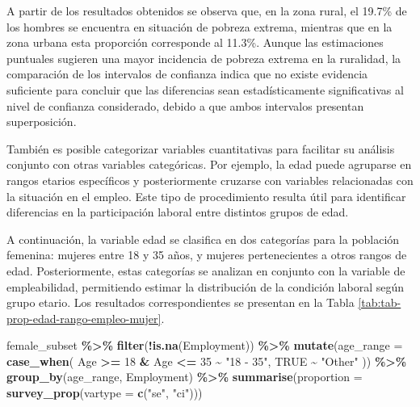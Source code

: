 \documentclass[
  spanish,
  12pt,
]{book}
\newenvironment{Shaded}{\begin{snugshade}}{\end{snugshade}}
\newcommand{\AttributeTok}[1]{\textcolor[rgb]{0.13,0.29,0.53}{#1}}
\newcommand{\ConstantTok}[1]{\textcolor[rgb]{0.56,0.35,0.01}{#1}}
\newcommand{\DecValTok}[1]{\textcolor[rgb]{0.00,0.00,0.81}{#1}}
\newcommand{\FunctionTok}[1]{\textcolor[rgb]{0.13,0.29,0.53}{\textbf{#1}}}
\newcommand{\NormalTok}[1]{#1}
\newcommand{\SpecialCharTok}[1]{\textcolor[rgb]{0.81,0.36,0.00}{\textbf{#1}}}
\newcommand{\StringTok}[1]{\textcolor[rgb]{0.31,0.60,0.02}{#1}}
\begin{document}
A partir de los resultados obtenidos se observa que, en la zona rural, el 19.7\% de los hombres se encuentra en situación de pobreza extrema, mientras que en la zona urbana esta proporción corresponde al 11.3\%. Aunque las estimaciones puntuales sugieren una mayor incidencia de pobreza extrema en la ruralidad, la comparación de los intervalos de confianza indica que no existe evidencia suficiente para concluir que las diferencias sean estadísticamente significativas al nivel de confianza considerado, debido a que ambos intervalos presentan superposición.

También es posible categorizar variables cuantitativas para facilitar su análisis conjunto con otras variables categóricas. Por ejemplo, la edad puede agruparse en rangos etarios específicos y posteriormente cruzarse con variables relacionadas con la situación en el empleo. Este tipo de procedimiento resulta útil para identificar diferencias en la participación laboral entre distintos grupos de edad.

A continuación, la variable edad se clasifica en dos categorías para la población femenina: mujeres entre 18 y 35 años, y mujeres pertenecientes a otros rangos de edad. Posteriormente, estas categorías se analizan en conjunto con la variable de empleabilidad, permitiendo estimar la distribución de la condición laboral según grupo etario. Los resultados correspondientes se presentan en la Tabla \ref{tab:tab-prop-edad-rango-empleo-mujer}.

\begin{Shaded}
\begin{Highlighting}[]
\NormalTok{female\_subset }\SpecialCharTok{\%\textgreater{}\%}
  \FunctionTok{filter}\NormalTok{(}\SpecialCharTok{!}\FunctionTok{is.na}\NormalTok{(Employment)) }\SpecialCharTok{\%\textgreater{}\%}
  \FunctionTok{mutate}\NormalTok{(}\AttributeTok{age\_range =} \FunctionTok{case\_when}\NormalTok{(}
\NormalTok{    Age }\SpecialCharTok{\textgreater{}=} \DecValTok{18} \SpecialCharTok{\&}\NormalTok{ Age }\SpecialCharTok{\textless{}=} \DecValTok{35} \SpecialCharTok{\textasciitilde{}} \StringTok{"18 {-} 35"}\NormalTok{,}
    \ConstantTok{TRUE} \SpecialCharTok{\textasciitilde{}} \StringTok{"Other"}
\NormalTok{  )) }\SpecialCharTok{\%\textgreater{}\%}
  \FunctionTok{group\_by}\NormalTok{(age\_range, Employment) }\SpecialCharTok{\%\textgreater{}\%}
  \FunctionTok{summarise}\NormalTok{(}\AttributeTok{proportion =} \FunctionTok{survey\_prop}\NormalTok{(}\AttributeTok{vartype =} \FunctionTok{c}\NormalTok{(}\StringTok{"se"}\NormalTok{, }\StringTok{"ci"}\NormalTok{)))}
\end{Highlighting}
\end{Shaded}
\end{document}
